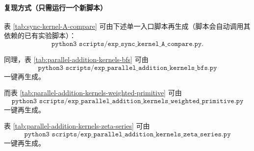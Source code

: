 \paragraph{复现方式（只需运行一个新脚本）}
表 \ref{tab:sync-kernel-A-compare} 可由下述单一入口脚本再生成（脚本会自动调用其依赖的已有实验脚本）：
\[
\texttt{python3 scripts/exp\_sync\_kernel\_A\_compare.py}.
\]

同理，表 \ref{tab:parallel-addition-kernels-bfs} 可由
\[
\texttt{python3 scripts/exp\_parallel\_addition\_kernels\_bfs.py}
\]
一键再生成。

而表 \ref{tab:parallel-addition-kernels-weighted-primitive} 可由
\[
\texttt{python3 scripts/exp\_parallel\_addition\_kernels\_weighted\_primitive.py}
\]
一键再生成。

表 \ref{tab:parallel-addition-kernels-zeta-series} 可由
\[
\texttt{python3 scripts/exp\_parallel\_addition\_kernels\_zeta\_series.py}
\]
一键再生成。

